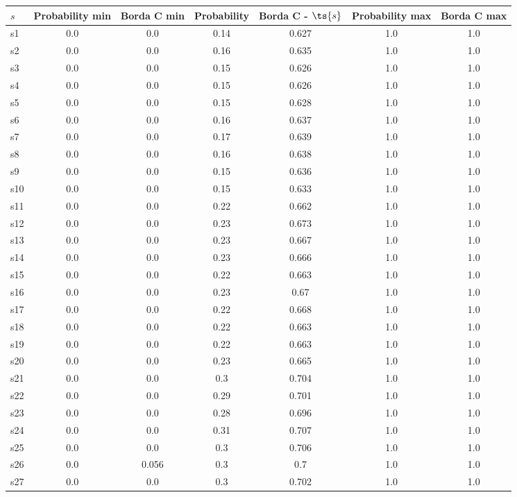 \documentclass{article}
\begin{document}
\noindent\begin{tabular}{|l|c|c|c|c|c|c|}
\hline
$s$& Probability min & Borda C min & Probability & Borda C - $\ts{s}$ & Probability max & Borda C max\\
\hline
s1 &0.0 & 0.0 & 0.14 & 0.627 & 1.0 & 1.0\\
\hline
s2 &0.0 & 0.0 & 0.16 & 0.635 & 1.0 & 1.0\\
\hline
s3 &0.0 & 0.0 & 0.15 & 0.626 & 1.0 & 1.0\\
\hline
s4 &0.0 & 0.0 & 0.15 & 0.626 & 1.0 & 1.0\\
\hline
s5 &0.0 & 0.0 & 0.15 & 0.628 & 1.0 & 1.0\\
\hline
s6 &0.0 & 0.0 & 0.16 & 0.637 & 1.0 & 1.0\\
\hline
s7 &0.0 & 0.0 & 0.17 & 0.639 & 1.0 & 1.0\\
\hline
s8 &0.0 & 0.0 & 0.16 & 0.638 & 1.0 & 1.0\\
\hline
s9 &0.0 & 0.0 & 0.15 & 0.636 & 1.0 & 1.0\\
\hline
s10 &0.0 & 0.0 & 0.15 & 0.633 & 1.0 & 1.0\\
\hline
s11 &0.0 & 0.0 & 0.22 & 0.662 & 1.0 & 1.0\\
\hline
s12 &0.0 & 0.0 & 0.23 & 0.673 & 1.0 & 1.0\\
\hline
s13 &0.0 & 0.0 & 0.23 & 0.667 & 1.0 & 1.0\\
\hline
s14 &0.0 & 0.0 & 0.23 & 0.666 & 1.0 & 1.0\\
\hline
s15 &0.0 & 0.0 & 0.22 & 0.663 & 1.0 & 1.0\\
\hline
s16 &0.0 & 0.0 & 0.23 & 0.67 & 1.0 & 1.0\\
\hline
s17 &0.0 & 0.0 & 0.22 & 0.668 & 1.0 & 1.0\\
\hline
s18 &0.0 & 0.0 & 0.22 & 0.663 & 1.0 & 1.0\\
\hline
s19 &0.0 & 0.0 & 0.22 & 0.663 & 1.0 & 1.0\\
\hline
s20 &0.0 & 0.0 & 0.23 & 0.665 & 1.0 & 1.0\\
\hline
s21 &0.0 & 0.0 & 0.3 & 0.704 & 1.0 & 1.0\\
\hline
s22 &0.0 & 0.0 & 0.29 & 0.701 & 1.0 & 1.0\\
\hline
s23 &0.0 & 0.0 & 0.28 & 0.696 & 1.0 & 1.0\\
\hline
s24 &0.0 & 0.0 & 0.31 & 0.707 & 1.0 & 1.0\\
\hline
s25 &0.0 & 0.0 & 0.3 & 0.706 & 1.0 & 1.0\\
\hline
s26 &0.0 & 0.056 & 0.3 & 0.7 & 1.0 & 1.0\\
\hline
s27 &0.0 & 0.0 & 0.3 & 0.702 & 1.0 & 1.0\\

\end{tabular}
\end{document}
